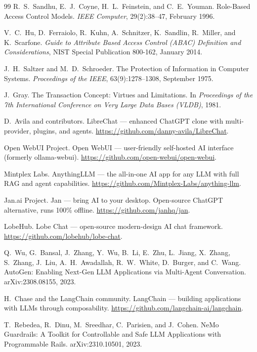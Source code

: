 \documentclass[11pt]{article}
\begin{document}
\begin{thebibliography}{99}
R.~S.~Sandhu, E.~J.~Coyne, H.~L.~Feinstein, and C.~E.~Youman.
Role-Based Access Control Models.
\emph{IEEE Computer}, 29(2):38--47, February 1996.

V.~C.~Hu, D.~Ferraiolo, R.~Kuhn, A.~Schnitzer, K.~Sandlin, R.~Miller,
and K.~Scarfone.
\emph{Guide to Attribute Based Access Control (ABAC) Definition and
Considerations}, NIST Special Publication 800-162, January 2014.

J.~H.~Saltzer and M.~D.~Schroeder.
The Protection of Information in Computer Systems.
\emph{Proceedings of the IEEE}, 63(9):1278--1308, September 1975.

J.~Gray.
The Transaction Concept: Virtues and Limitations.
In \emph{Proceedings of the 7th International Conference on Very Large
Data Bases (VLDB)}, 1981.

D.~Avila and contributors.
LibreChat --- enhanced ChatGPT clone with multi-provider, plugins, and
agents. \url{https://github.com/danny-avila/LibreChat}.

Open WebUI Project.
Open WebUI --- user-friendly self-hosted AI interface (formerly
ollama-webui). \url{https://github.com/open-webui/open-webui}.

Mintplex Labs.
AnythingLLM --- the all-in-one AI app for any LLM with full RAG and
agent capabilities. \url{https://github.com/Mintplex-Labs/anything-llm}.

Jan.ai Project.
Jan --- bring AI to your desktop. Open-source ChatGPT alternative,
runs 100\% offline. \url{https://github.com/janhq/jan}.

LobeHub.
Lobe Chat --- open-source modern-design AI chat framework.
\url{https://github.com/lobehub/lobe-chat}.

Q.~Wu, G.~Bansal, J.~Zhang, Y.~Wu, B.~Li, E.~Zhu, L.~Jiang, X.~Zhang,
S.~Zhang, J.~Liu, A.~H.~Awadallah, R.~W.~White, D.~Burger, and
C.~Wang.
AutoGen: Enabling Next-Gen LLM Applications via Multi-Agent
Conversation.
arXiv:2308.08155, 2023.

H.~Chase and the LangChain community.
LangChain --- building applications with LLMs through composability.
\url{https://github.com/langchain-ai/langchain}.

T.~Rebedea, R.~Dinu, M.~Sreedhar, C.~Parisien, and J.~Cohen.
NeMo Guardrails: A Toolkit for Controllable and Safe LLM Applications
with Programmable Rails.
arXiv:2310.10501, 2023.


\end{thebibliography}
\end{document}
